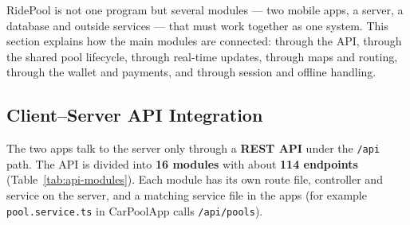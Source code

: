 RidePool is not one program but several modules --- two mobile apps, a server,
a database and outside services --- that must work together as one system.
This section explains how the main modules are connected: through the API,
through the shared pool lifecycle, through real-time updates, through maps and
routing, through the wallet and payments, and through session and offline
handling.

\subsection{Client--Server API Integration}
\label{subsec:api}

The two apps talk to the server only through a \textbf{REST API} under the
\texttt{/api} path. The API is divided into \textbf{16 modules} with about
\textbf{114 endpoints} (Table~\ref{tab:api-modules}). Each module has its own
route file, controller and service on the server, and a matching service file
in the apps (for example \texttt{pool.service.ts} in CarPoolApp calls
\texttt{/api/pools}).

